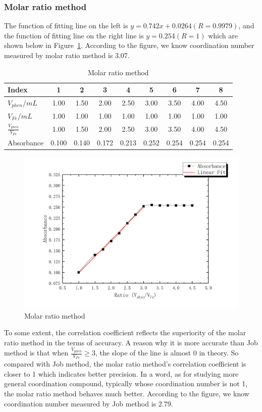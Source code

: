 \subsubsection{Molar ratio method}

The function of fitting line on the left is $y=0.742x+0.0264(R=0.9979)$, and the function of fitting line on the right line is $y=0.254(R=1)$ which are shown below in Figure~\ref{fig2}. According to the figure, we know coordination number measured by molar ratio method is 3.07.

\begin{table}[H]
	\caption{Molar ratio method}
	\label{Tab.Mrm}
	\begin{tabular}{lcccccccc}
	\toprule
	Index         &  1  &  2  &  3  &  4  &  5  &  6  &  7  &  8  \\
	\midrule
	$V_{phen}/mL$ &1.00 &1.50 &2.00 &2.50 &3.00 &3.50 &4.00 &4.50 \\
	$V_{Fe}/mL$   &1.00 &1.00 &1.00 &1.00 &1.00 &1.00 &1.00 &1.00 \\
	$\frac{V_{phen}}{V_{Fe}}$
				  &1.00 &1.50 &2.00 &2.50 &3.00 &3.50 &4.00 &4.50 \\
	Absorbance    &0.100&0.140&0.172&0.213&0.252&0.254&0.254&0.254\\
	\bottomrule
	\end{tabular}
\end{table}

\begin{figure}[H]
	\includegraphics[width=\linewidth]{Fig2.pdf}
	\caption{Molar ratio method}
	\label{fig2}
\end{figure}

To some extent, the correlation coefficient reflects the superiority of the molar ratio method in the terms of accuracy. A reason why it is more accurate than Job method is that when $\frac{V_{phen}}{V_{Fe}}\geq3$, the slope of the line is almost 0 in theory. So compared with Job method, the molar ratio method’s correlation coefficient is closer to 1 which indicates better precision. In a word, as for studying more general coordination compound, typically whose coordination number is not 1, the molar ratio method behaves much better. According to the figure, we know coordination number measured by Job method is 2.79.

